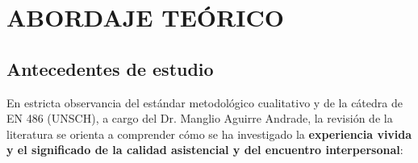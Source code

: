 \section{ABORDAJE TEÓRICO}
\label{sec:cap3_teoria}

\subsection{Antecedentes de estudio}
\label{sec:3.1_antecedentes}
En estricta observancia del estándar metodológico cualitativo y de la cátedra de EN 486 (UNSCH), a cargo del Dr. Manglio Aguirre Andrade, la revisión de la literatura se orienta a comprender cómo se ha investigado la \textbf{experiencia vivida y el significado de la calidad asistencial y del encuentro interpersonal}:

